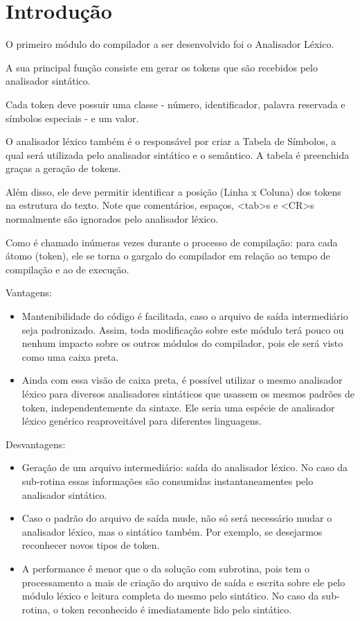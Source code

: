 
\section{Introdução}

O primeiro módulo do compilador a ser desenvolvido foi o Analisador Léxico.


A sua principal função consiste em gerar os tokens que são recebidos pelo analisador sintático.


Cada token deve possuir uma classe  - número, identificador, palavra reservada e símbolos especiais - e um valor.


O analisador léxico também é o responsável por criar a Tabela de Símbolos, a qual será utilizada pelo analisador sintático e o semântico. A tabela é preenchida graças a geração de tokens.


Além disso, ele deve permitir identificar a posição (Linha x Coluna) dos tokens na estrutura do texto. Note que comentários, espaços, <tab>s e <CR>s normalmente são ignorados pelo analisador léxico.

 
Como é chamado inúmeras vezes durante o processo de compilação: para cada átomo (token), ele se torna o gargalo do compilador em relação ao tempo de compilação e ao de execução.

Vantagens:
\begin{itemize}
	\item Mantenibilidade do código é facilitada, caso o arquivo de saída intermediário seja padronizado. Assim, toda modificação sobre este módulo terá pouco ou nenhum impacto sobre os outros módulos do compilador, pois ele será visto como uma caixa preta. 
	\item Ainda com essa visão de caixa preta, é possível utilizar o mesmo analisador léxico para diversos analisadores sintáticos que usassem os mesmos padrões de token, independentemente da sintaxe. Ele seria uma espécie de analisador léxico genérico reaproveitável para diferentes linguagens.
\end{itemize}

Desvantagens:
\begin{itemize}
	\item Geração de um arquivo intermediário: saída do analisador léxico. No caso da sub-rotina essas informações são consumidas instantaneamentes pelo analisador sintático.
	\item Caso o padrão do arquivo de saída mude, não só será necessário mudar o analisador léxico, mas o sintático também. Por exemplo, se desejarmos reconhecer novos tipos de token.
	\item A performance é menor que o da solução com subrotina, pois tem o processamento a mais de criação do arquivo de saída e escrita sobre ele pelo módulo léxico e leitura completa do mesmo pelo sintático. No caso da sub-rotina, o token reconhecido é imediatamente lido pelo sintático.
\end{itemize}


